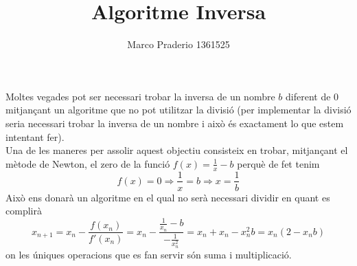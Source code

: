 \documentclass[a4paper,10pt]{article}
\title{Algoritme Inversa}
\author{Marco Praderio 1361525}
\date{}
\renewcommand{\*}{\cdot}
\begin{document}
\maketitle
Moltes vegades pot ser necessari trobar la inversa de un nombre $b$ diferent de 0 mitjançant un algoritme que no pot utilitzar la divisió (per implementar la divisió seria
necessari trobar la inversa de un nombre i això és exactament lo que estem intentant fer).\\
Una de les maneres per assolir aquest objectiu consisteix en trobar, mitjançant el mètode de Newton, el zero de la funció $f(x)=\frac{1}{x}-b$ perquè de fet tenim
\begin{equation*}
f(x)=0 \Rightarrow \frac{1}{x}=b \Rightarrow x=\frac{1}{b} 
\end{equation*}
Això ens donarà un algoritme en el qual no serà necessari dividir en quant es complirà
\begin{equation*}
x_{n+1}=x_n-\frac{f(x_n)}{f'(x_n)}=x_n-\frac{\frac{1}{x_n}-b}{-\frac{1}{x_n^2}}=x_n+x_n-x_n^2b=x_n(2-x_nb)
\end{equation*}
on les úniques operacions que es fan servir són suma i multiplicació.
\end{document}
